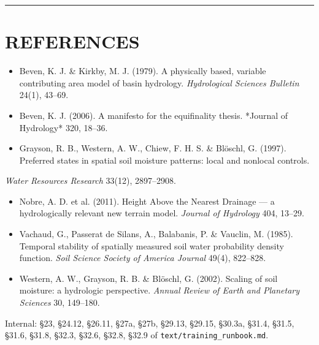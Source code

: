 \documentclass[10pt,a4paper]{article}
\begin{document}
\medskip\hrule\medskip

\section*{REFERENCES}

\begin{itemize}[leftmargin=1.2em,itemsep=1pt,topsep=3pt]
\item Beven, K. J. \& Kirkby, M. J. (1979). A physically based, variable contributing
area model of basin hydrology. \emph{Hydrological Sciences Bulletin} 24(1), 43–69.
\item Beven, K. J. (2006). A manifesto for the equifinality thesis. *Journal of
Hydrology* 320, 18–36.
\item Grayson, R. B., Western, A. W., Chiew, F. H. S. \& Blöschl, G. (1997). Preferred
states in spatial soil moisture patterns: local and nonlocal controls.
\end{itemize}
  \emph{Water Resources Research} 33(12), 2897–2908.
\begin{itemize}[leftmargin=1.2em,itemsep=1pt,topsep=3pt]
\item Nobre, A. D. et al. (2011). Height Above the Nearest Drainage — a
hydrologically relevant new terrain model. \emph{Journal of Hydrology} 404, 13–29.
\item Vachaud, G., Passerat de Silans, A., Balabanis, P. \& Vauclin, M. (1985).
Temporal stability of spatially measured soil water probability density
function. \emph{Soil Science Society of America Journal} 49(4), 822–828.
\item Western, A. W., Grayson, R. B. \& Blöschl, G. (2002). Scaling of soil moisture:
a hydrologic perspective. \emph{Annual Review of Earth and Planetary Sciences} 30,
149–180.
\end{itemize}

Internal: §23, §24.12, §26.11, §27a, §27b, §29.13, §29.15, §30.3a, §31.4,
§31.5, §31.6, §31.8, §32.3, §32.6, §32.8, §32.9 of \texttt{text/training\_runbook.md}.
\end{document}
